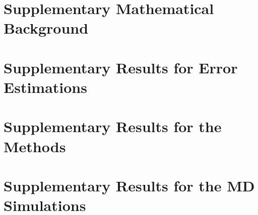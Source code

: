 \documentclass[a4paper]{ustthesis}
\begin{document}


\newpage

\appendix

\chapter{Supplementary Mathematical Background}
\label{chp_math}


% 

\chapter{Supplementary Results for Error Estimations}
\label{chp_appendix_icm}


\chapter{Supplementary Results for the Methods}
\label{chp_appendix_soe}


\chapter{Supplementary Results for the MD Simulations}
\label{chp_appendix_quasiewald}

\end{document}
